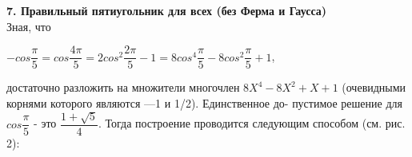 
\newpage
\noindent\textbf{7. Правильный пятиугольник для всех (без Ферма и Гаусса)}\\

Зная, что
\begin{center}
$-cos\dfrac{\pi}{5}=cos\dfrac{4\pi}{5}=2cos^2\dfrac{2\pi}{5}-1=8cos^4\dfrac{\pi}{5}-8cos^2\dfrac{\pi}{5}+1$,
\end{center}
достаточно разложить на множители многочлен $8X^4-8X^2+X+1$\linebreak
(очевидными корнями которого являются —1 и 1/2). Единственное до-\linebreak
пустимое решение для $cos\dfrac{\pi}{5}$ - это $\dfrac{1+\sqrt{5}}{4}$. Тогда построение проводится\linebreak
следующим способом (см. рис. 2):\\

